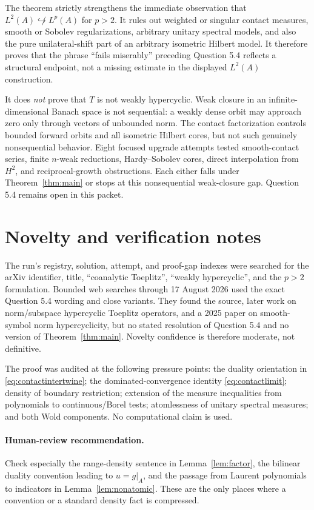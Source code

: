 \documentclass[11pt]{article}
\begin{document}
The theorem strictly strengthens the immediate observation that
$L^2(A)\not\hookrightarrow L^p(A)$ for $p>2$.  It rules out weighted or
singular contact measures, smooth or Sobolev regularizations, arbitrary
unitary spectral models, and also the pure unilateral-shift part of an
arbitrary isometric Hilbert model.  It therefore proves that the phrase
``fails miserably'' preceding Question 5.4 reflects a structural endpoint,
not a missing estimate in the displayed $L^2(A)$ construction.

It does \emph{not} prove that $T$ is not weakly hypercyclic.  Weak closure in
an infinite-dimensional Banach space is not sequential: a weakly dense orbit
may approach zero only through vectors of unbounded norm.  The contact
factorization controls bounded forward orbits and all isometric Hilbert cores,
but not such genuinely nonsequential behavior.  Eight focused upgrade
attempts tested smooth-contact series, finite $n$-weak reductions,
Hardy--Sobolev cores, direct interpolation from $H^2$, and reciprocal-growth
obstructions.  Each either falls under Theorem~\ref{thm:main} or stops at this
nonsequential weak-closure gap.  Question 5.4 remains open in this packet.

\section{Novelty and verification notes}

The run's registry, solution, attempt, and proof-gap indexes were searched for
the arXiv identifier, title, ``coanalytic Toeplitz'', ``weakly hypercyclic'',
and the $p>2$ formulation.  Bounded web searches through 17 August 2026 used
the exact Question 5.4 wording and close variants.  They found the source,
later work on norm/subspace hypercyclic Toeplitz operators, and a 2025 paper on
smooth-symbol norm hypercyclicity, but no stated resolution of Question 5.4
and no version of Theorem~\ref{thm:main}.  Novelty confidence is therefore
moderate, not definitive.

The proof was audited at the following pressure points: the duality orientation
in \eqref{eq:contactintertwine}; the dominated-convergence identity
\eqref{eq:contactlimit}; density of boundary restriction; extension of the
measure inequalities from polynomials to continuous/Borel tests; atomlessness
of unitary spectral measures; and both Wold components.  No computational
claim is used.

\paragraph{Human-review recommendation.}
Check especially the range-density sentence in Lemma~\ref{lem:factor}, the
bilinear duality convention leading to $u=g|_A$, and the passage from Laurent
polynomials to indicators in Lemma~\ref{lem:nonatomic}.  These are the only
places where a convention or a standard density fact is compressed.
\end{document}
